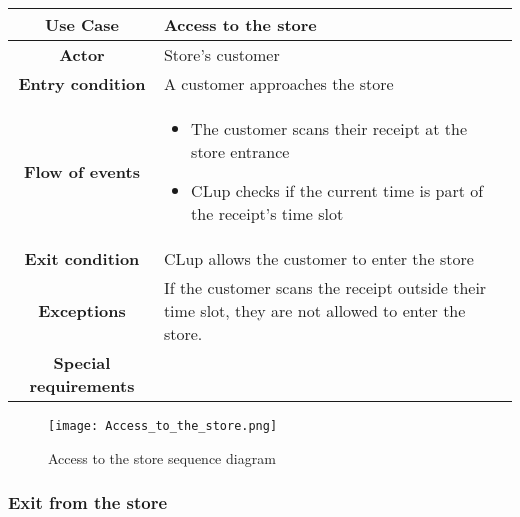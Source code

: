 \documentclass[../../main.tex]{subfiles}
\begin{document}
      \begin{table}[H]
        \centering
          \begin{tabular}{c m{}}
          \hline
          \textbf{Use Case} & Access to the store \\ \hline
          \textbf{Actor} & Store's customer\\ \hline
          \textbf{Entry condition} & A customer approaches the store\\  \hline
          \textbf{Flow of events} & \begin{itemize}
                                      \item The customer scans their receipt at the store entrance
                                      \item CLup checks if the current time is part of the receipt's time slot
                                    \end{itemize}\\ \hline
          \textbf{Exit condition} & CLup allows the customer to enter the store \\ \hline
          \textbf{Exceptions} & If the customer scans the receipt outside their time slot, they are not allowed to enter the store. \\ \hline
          \textbf{Special requirements} &\\ \hline
          \end{tabular}
      \end{table}

      \begin{figure}[H]
        \centering
        \texttt{[image: Access\_to\_the\_store.png]}
        \caption{Access to the store sequence diagram}
      \end{figure}


      \subsubsection{Exit from the store}
\end{document}
